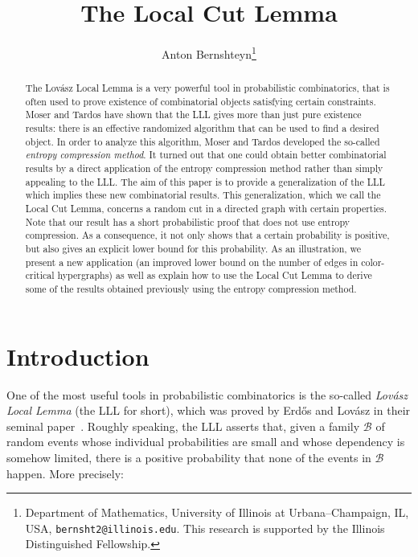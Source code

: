 \documentclass[10pt]{article}
\title{The Local Cut Lemma}
\date{}
\author{Anton Bernshteyn\thanks{Department of Mathematics, University of Illinois at Urbana--Champaign, IL, USA, \texttt{bernsht2@illinois.edu}. This research is supported by the Illinois Distinguished Fellowship.}}
\numberwithin{equation}{subsection}
\theoremstyle{definition}
\def\keywords{\vspace{.2em}
{\textit{Keywords}: \relax%
}}
\def\endkeywords{\par}
\begin{document}
	
	\maketitle
	
	\begin{abstract}
		The Lov\'{a}sz Local Lemma is a very powerful tool in probabilistic combinatorics, that is often used to prove existence of combinatorial objects satisfying certain constraints. Moser and Tardos \cite{Moser} have shown that the LLL gives more than just pure existence results: there is an effective randomized algorithm that can be used to find a desired object. In order to analyze this algorithm, Moser and Tardos developed the so-called \emph{entropy compression method}. It turned out that one could obtain better combinatorial results by a direct application of the entropy compression method rather than simply appealing to the LLL. The aim of this paper is to provide a generalization of the LLL which implies these new combinatorial results. This generalization, which we call the Local Cut Lemma, concerns a random cut in a directed graph with certain properties. Note that our result has a short probabilistic proof that does not use entropy compression. As a consequence, it not only shows that a certain probability is positive, but also gives an explicit lower bound for this probability. As an illustration, we present a new application (an improved lower bound on the number of edges in color-critical hypergraphs) as well as explain how to use the Local Cut Lemma to derive some of the results obtained previously using the entropy compression method.
	\end{abstract}
	
	
	\tableofcontents
	
	\section{Introduction}
	
	One of the most useful tools in probabilistic combinatorics is the so-called \emph{Lov\'{a}sz Local Lemma} (the LLL for short), which was proved by Erd\H{o}s and Lov\'{a}sz in their seminal paper~\cite{EL}. Roughly speaking, the LLL asserts that, given a family $\mathcal{B}$ of random events whose individual probabilities are small and whose dependency is somehow limited, there is a positive probability that none of the events in $\mathcal{B}$ happen. More precisely:
	
\end{document}

